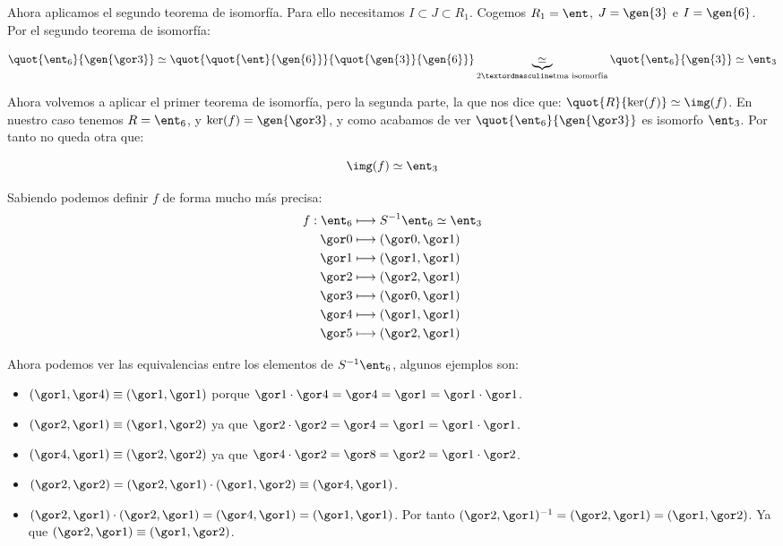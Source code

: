 \begin{example}
	Ahora aplicamos el segundo teorema de isomorfía. Para ello necesitamos $I \subset J \subset R_1$. Cogemos $R_1 = \ent$, $J=\gen{3}$ e $I=\gen{6}$. Por el segundo teorema de isomorfía:

	$$ \quot{\ent_6}{\gen{\cls{3}}} \simeq \quot{\quot{\ent}{\gen{6}}}{\quot{\gen{3}}{\gen{6}}} \underbrace{\simeq}_{2º \text{tma isomorfía} } \quot{\ent_6}{\gen{3}} \simeq \ent_3$$

	Ahora volvemos a aplicar el primer teorema de isomorfía, pero la segunda parte, la que nos dice que: $\quot{R}{\ker(f)} \simeq \img(f)$. En nuestro caso tenemos $R=\ent_6$, y $\ker(f)=\gen{\cls{3}}$, y como acabamos de ver  $\quot{\ent_6}{\gen{\cls{3}}}$ es isomorfo $\ent_3$. Por tanto no queda otra que:

	$$\img(f) \simeq \ent_3$$

	Sabiendo podemos definir $f$ de forma mucho más precisa:
	\begin{align*}
		f: \ent_6 & \longmapsto  S^{-1}\ent_6 \simeq \ent_3\\
		\cls{0} & \longmapsto (\cls{0},\cls{1}) \\
		\cls{1} & \longmapsto (\cls{1},\cls{1}) \\
		\cls{2} & \longmapsto (\cls{2},\cls{1}) \\
		\cls{3} & \longmapsto (\cls{0},\cls{1}) \\
		\cls{4} & \longmapsto (\cls{1},\cls{1}) \\
		\cls{5} & \longmapsto (\cls{2},\cls{1}) \\
	\end{align*}

	Ahora podemos ver las equivalencias entre los elementos de $S^{-1}\ent_6$, algunos ejemplos son:
	\begin{itemize}
		\item $(\cls{1},\cls{4})\equiv (\cls{1},\cls{1})$ porque $\cls{1}\cdot \cls{4} = \cls{4} = \cls{1} =\cls{1}\cdot \cls{1}$.
		\item $(\cls{2},\cls{1}) \equiv (\cls{1},\cls{2})$ ya que $\cls{2}\cdot \cls{2} = \cls{4} = \cls{1} =\cls{1}\cdot \cls{1}$.
		\item $(\cls{4},\cls{1}) \equiv (\cls{2},\cls{2})$ ya que $\cls{4}\cdot \cls{2} = \cls{8} = \cls{2} =\cls{1}\cdot \cls{2}$.
		\item $(\cls{2}, \cls{2}) = (\cls{2},\cls{1}) \cdot (\cls{1},\cls{2}) \equiv (\cls{4},\cls{1}) $.
		\item $(\cls{2},\cls{1}) \cdot (\cls{2},\cls{1}) = (\cls{4},\cls{1}) = (\cls{1},\cls{1})$. Por tanto $(\cls{2},\cls{1})^{-1}=(\cls{2},\cls{1}) = (\cls{1},\cls{2})$. Ya que $(\cls{2},\cls{1}) \equiv (\cls{1},\cls{2})$.
	\end{itemize}
	\end{example}

